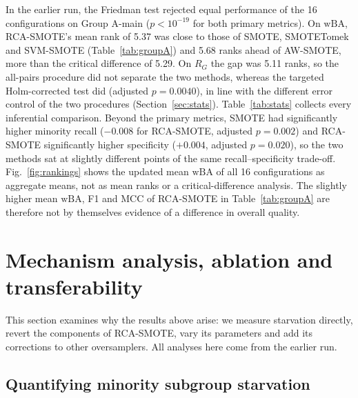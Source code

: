 \documentclass[preprint,nopreprintline]{elsarticle}
\theoremstyle{plain}
\theoremstyle{definition}
\newcommand{\wba}{\mathrm{wBA}}
\newcommand{\rg}{R_{G}}
\begin{document}
In the earlier run, the Friedman test rejected equal performance of the 16 configurations on Group A-main ($p<10^{-19}$ for both primary metrics). On $\wba$, RCA-SMOTE's mean rank of 5.37 was close to those of SMOTE, SMOTETomek and SVM-SMOTE (Table~\ref{tab:groupA}) and 5.68 ranks ahead of AW-SMOTE, more than the critical difference of 5.29. On $\rg$ the gap was 5.11 ranks, so the all-pairs procedure did not separate the two methods, whereas the targeted Holm-corrected test did (adjusted $p=0.0040$), in line with the different error control of the two procedures (Section~\ref{sec:stats}). Table~\ref{tab:stats} collects every inferential comparison. Beyond the primary metrics, SMOTE had significantly higher minority recall ($-0.008$ for RCA-SMOTE, adjusted $p=0.002$) and RCA-SMOTE significantly higher specificity ($+0.004$, adjusted $p=0.020$), so the two methods sat at slightly different points of the same recall--specificity trade-off. Fig.~\ref{fig:rankings} shows the updated mean $\wba$ of all 16 configurations as aggregate means, not as mean ranks or a critical-difference analysis. The slightly higher mean $\wba$, F1 and MCC of RCA-SMOTE in Table~\ref{tab:groupA} are therefore not by themselves evidence of a difference in overall quality.

\section{Mechanism analysis, ablation and transferability}\label{sec:mechanism}

This section examines why the results above arise: we measure starvation directly, revert the components of RCA-SMOTE, vary its parameters and add its corrections to other oversamplers. All analyses here come from the earlier run.

\subsection{Quantifying minority subgroup starvation}\label{sec:starvation}
\end{document}

